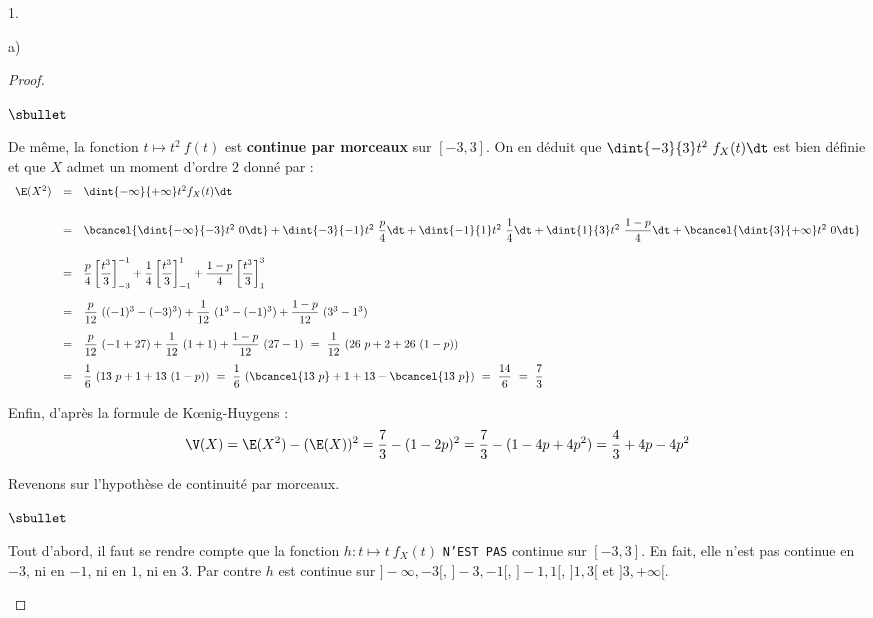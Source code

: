 \documentclass[11pt]{article}%
\begin{document}
\begin{noliste}{1.}
\begin{noliste}{a)}
\begin{proof}
\begin{noliste}{$\sbullet$}
      \item De même, la fonction $t \mapsto t^2 \ f(t)$ est {\bf
          continue par morceaux} sur $[-3, 3]$. On en déduit que
        $\dint{-3}{3} t^2 \ f_X(t) \dt$ est bien définie et que $X$
        admet un moment d'ordre $2$ donné par :
        \[
        \begin{array}{rcl}
          \E(X^2) 
          & = & \dint{-\infty}{+\infty} t^2 f_X(t)\dt \\[.6cm]
          & = & \bcancel{\dint{-\infty}{-3} t^2 \ 0 \dt} +
          \dint{-3}{-1}t^2\ \dfrac{p}{4}\dt +
          \dint{-1}{1}t^2\ \dfrac{1}{4}\dt + \dint{1}{3}t^2\
          \dfrac{1-p}{4}\dt + \bcancel{\dint{3}{+\infty} t^2 \ 0
            \dt} \\[.6cm]
          & = & \dfrac{p}{4}\left[ \dfrac{t^3}{3} \right]_{-3}^{-1}
          +\dfrac{1}{4}\left[ \dfrac{t^3}{3} \right]_{-1}^{1}
          +\dfrac{1-p}{4}\left[ \dfrac{t^3}{3} \right]_{1}^{3}  \\[.6cm]
          & = & \dfrac{p}{12} \ ((-1)^3 - (-3)^3) + \dfrac{1}{12} \
          (1^3 - (-1)^3) + \dfrac{1-p}{12} \ (3^3 - 1^3) \\[.4cm]
          & = & \dfrac{p}{12} \ (-1 + 27) + \dfrac{1}{12} \
          (1 + 1) + \dfrac{1-p}{12} \ (27 - 1) 
          \ = \ \dfrac{1}{12} \ (26 \ p + 2 + 26 \ (1-p))
          \\[.4cm]
          & = & \dfrac{1}{6} \ (13 \ p + 1 + 13 \ (1-p)) \ = \
          \dfrac{1}{6} \ (\bcancel{13 \ p} + 1 + 13 - \bcancel{13 \ p}) \ = \
          \dfrac{14}{6} \ = \ \dfrac{7}{3}
        \end{array}
        \]
     
      \item Enfin, d'après la formule de K\oe{}nig-Huygens :
        \[
        \V(X) = \E(X^2) - (\E(X))^2 = \dfrac{7}{3}-(1-2p)^2 =
        \dfrac{7}{3} - (1 - 4p + 4p^2) = \dfrac{4}{3} + 4p - 4p^2
        \]
      \end{noliste}
      \conc{Ainsi, $\E(X) = 1-2p$ \ et \ $\V(X) = \dfrac{4}{3} + 4p -
        4p^2$.}%


      \newpage


      \begin{remark}%
        Revenons sur l'hypothèse de continuité par morceaux.
        \begin{noliste}{$\sbullet$}
        \item Tout d'abord, il faut se rendre compte que la fonction
          $h : t \mapsto t \ f_X(t)$ {\tt N'EST PAS} continue sur
          $[-3, 3]$. En fait, elle n'est pas continue en $-3$, ni en
          $-1$, ni en $1$, ni en $3$. Par contre $h$ est continue sur
          $]-\infty, -3[$, $]-3, -1[$, $]-1, 1[$, $]1, 3[$ et $]3,
          +\infty[$.
          

\end{noliste}
\end{remark}
\end{proof}
\end{noliste}
\end{noliste}
\end{document}
